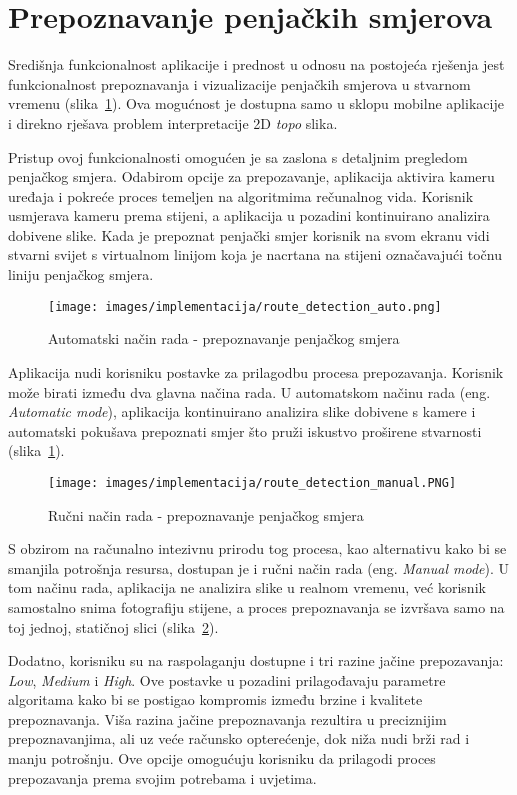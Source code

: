 \section{Prepoznavanje penjačkih smjerova}

Središnja funkcionalnost aplikacije i prednost u odnosu na postojeća rješenja jest funkcionalnost prepoznavanja i vizualizacije penjačkih smjerova u stvarnom vremenu (slika~\ref{fig:prepoznavanje_penjačkog_smjera_auto}). Ova mogućnost je dostupna samo u sklopu mobilne aplikacije i direkno rješava problem interpretacije 2D \textit{topo} slika. 

Pristup ovoj funkcionalnosti omogućen je sa zaslona s detaljnim pregledom penjačkog smjera. Odabirom opcije za prepozavanje, aplikacija aktivira kameru uređaja i pokreće proces temeljen na algoritmima rečunalnog vida. Korisnik usmjerava kameru prema stijeni, a aplikacija u pozadini kontinuirano analizira dobivene slike. Kada je prepoznat penjački smjer korisnik na svom ekranu vidi stvarni svijet s virtualnom linijom koja je nacrtana na stijeni označavajući točnu liniju penjačkog smjera.

\begin{figure}[H]
    \centering
    \texttt{[image: images/implementacija/route\_detection\_auto.png]}
    \caption{Automatski način rada - prepoznavanje penjačkog smjera}
    \label{fig:prepoznavanje_penjačkog_smjera_auto}
\end{figure}

Aplikacija nudi korisniku postavke za prilagodbu procesa prepozavanja. Korisnik može birati između dva glavna načina rada. U automatskom načinu rada (eng. \textit{Automatic mode}), aplikacija kontinuirano analizira slike dobivene s kamere i automatski pokušava prepoznati smjer što pruži iskustvo proširene stvarnosti (slika~\ref{fig:prepoznavanje_penjačkog_smjera_auto}). 

\begin{figure}[H]
    \centering
    \texttt{[image: images/implementacija/route\_detection\_manual.PNG]}
    \caption{Ručni način rada - prepoznavanje penjačkog smjera}
    \label{fig:prepoznavanje_penjačkog_smjera_manual}
\end{figure}

S obzirom na računalno intezivnu prirodu tog procesa, kao alternativu kako bi se smanjila potrošnja resursa, dostupan je i ručni način rada (eng. \textit{Manual mode}). U tom načinu rada, aplikacija ne analizira slike u realnom vremenu, već korisnik samostalno snima fotografiju stijene, a proces prepoznavanja se izvršava samo na toj jednoj, statičnoj slici (slika~\ref{fig:prepoznavanje_penjačkog_smjera_manual}). 

Dodatno, korisniku su na raspolaganju dostupne i tri razine jačine prepozavanja: \textit{Low}, \textit{Medium} i \textit{High}. Ove postavke u pozadini prilagođavaju parametre algoritama kako bi se postigao kompromis između brzine i kvalitete prepoznavanja. Viša razina jačine prepoznavanja rezultira u preciznijim prepoznavanjima, ali uz veće računsko opterećenje, dok niža nudi brži rad i manju potrošnju. Ove opcije omogućuju korisniku da prilagodi proces prepozavanja prema svojim potrebama i uvjetima.